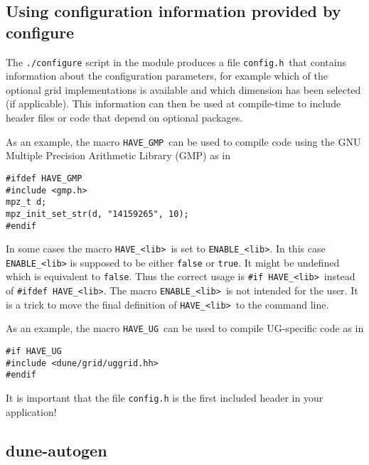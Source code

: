 \documentclass[11pt,a4paper,headinclude,footinclude,DIV16,normalheadings]{scrartcl}
\begin{document}
\subsection{Using configuration information provided by configure}

The \lstinline!./configure! script in the module produces a file
\lstinline!config.h!\ that contains information about the configuration
parameters, for example which of the optional grid implementations is
available and which dimension has been selected (if applicable). This
information can then be used at compile-time to include header files
or code that depend on optional packages.

As an example, the macro \lstinline!HAVE_GMP!\ can be used to compile
code using the GNU Multiple Precision Arithmetic Library (GMP) as in
\begin{lstlisting}[basicstyle=\ttfamily\scriptsize]
#ifdef HAVE_GMP
#include <gmp.h>
mpz_t d;
mpz_init_set_str(d, "14159265", 10);
#endif
\end{lstlisting}

In some cases the macro \lstinline!HAVE_<lib>!\ is set to 
\lstinline!ENABLE_<lib>!. In this case \lstinline!ENABLE_<lib>! is 
supposed to be either \texttt{false} or \texttt{true}. It might be
undefined which is equivalent to \texttt{false}. Thus the correct usage 
is \lstinline!#if HAVE_<lib>!\ instead of \lstinline!#ifdef HAVE_<lib>!.
The macro \lstinline!ENABLE_<lib>!\ is not intended for the user. It 
is a trick to move the final definition of \lstinline!HAVE_<lib>!\ 
to the command line.

As an example, the macro \lstinline!HAVE_UG!\ can be used to compile
UG-specific code as in
\begin{lstlisting}[basicstyle=\ttfamily\scriptsize]
#if HAVE_UG
#include <dune/grid/uggrid.hh>
#endif
\end{lstlisting}

It is important that the file \lstinline!config.h! is the first
included header in your application!




\subsection{dune-autogen}
\label{autogen}
\end{document}
